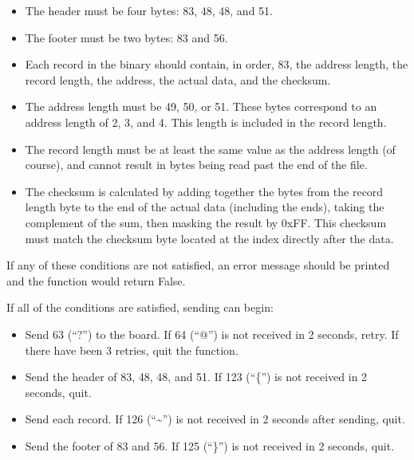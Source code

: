 \documentclass[12pt,letterpaper]{article}
\begin{document}
\begin{itemize}

\item The header must be four bytes: 83, 48, 48, and 51.

\item The footer must be two bytes: 83 and 56.

\item Each record in the binary should contain, in order, 83, the address length, the record length, the address, the actual data, and the checksum.

\item The address length must be 49, 50, or 51. These bytes correspond to an address length of 2, 3, and 4. This length is included in the record length.

\item The record length must be at least the same value as the address length (of course), and cannot result in bytes being read past the end of the file.

\item The checksum is calculated by adding together the bytes from the record length byte to the end of the actual data (including the ends), taking the complement of the sum, then masking the result by 0xFF. This checksum must match the checksum byte located at the index directly after the data.

\end{itemize}

If any of these conditions are not satisfied, an error message should be printed and the function would return False.

If all of the conditions are satisfied, sending can begin:

\begin{itemize}

\item Send 63 (``?'') to the board. If 64 (``@'') is not received in 2 seconds, retry. If there have been 3 retries, quit the function.

\item Send the header of 83, 48, 48, and 51. If 123 (``\{'') is not received in 2 seconds, quit.

\item Send each record. If 126 (``\textasciitilde'') is not received in 2 seconds after sending, quit.

\item Send the footer of 83 and 56. If 125 (``\}'') is not received in 2 seconds, quit.

\end{itemize}
\end{document}
